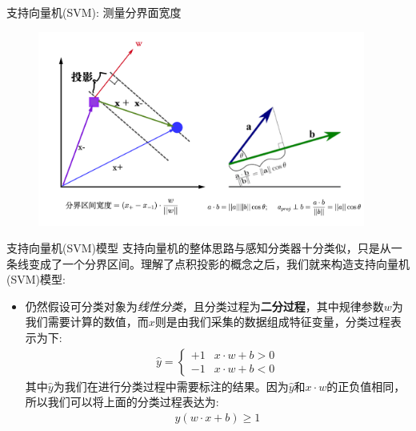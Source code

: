 \documentclass[handout]{ctexbeamer}
\begin{document}
\begin{frame}{支持向量机(SVM): 测量分界面宽度}
	\begin{figure}[H]
		\centering
		\includegraphics[width=0.96\textwidth]{fig/C2preProjection}
	\end{figure}
\end{frame}


\begin{frame}{支持向量机(SVM)模型}
	支持向量机的整体思路与感知分类器十分类似，只是从一条线变成了一个分界区间。理解了点积投影的概念之后，我们就来构造支持向量机(SVM)模型:
\begin{itemize}
	\item 仍然假设可分类对象为\textit{线性分类}，且分类过程为\textbf{二分过程}，其中规律参数$w$为我们需要计算的数值，而$x$则是由我们采集的数据组成特征变量，分类过程表示为下:
	\begin{align*}
		\hat{y} = \begin{cases}
			+1 & x \cdot w + b > 0 \\
			-1 & x \cdot w + b < 0 
		\end{cases}
	\end{align*}
	其中$\hat{y}$为我们在进行分类过程中需要标注的结果。因为$\hat{y}$和$x\cdot w$的正负值相同，所以我们可以将上面的分类过程表达为:
	\begin{align*}
		y(w \cdot x + b) \geq 1 
	\end{align*}
	\end{itemize}
\end{frame}
\end{document}
